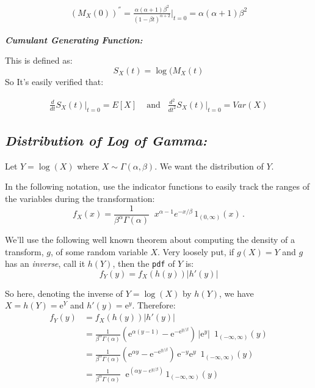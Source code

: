 \documentclass[12pt]{article}
\begin{document}
\begin{align*}
(M_X(0))^{''} =  \frac{\alpha (\alpha + 1) \beta^2} { (1 - \beta t)^{\alpha + 2}}  \Big | _{t=0} = \alpha (\alpha + 1)\beta^2
\end{align*}

\newpage

\begin{center}
\textbf{\color{TealBlue}\emph{Cumulant Generating Function:} } 
\end{center}
This is defined as:
$$
S_X(t) = \log (M_X(t)
$$
So 
It's easily verified that:


\begin{align*}
\frac{d}{dt} S_X(t) \Big|_{t=0} = E[X] \;\;\; \text{ and} \;\;\; \frac{d^2}{dt^2} S_X(t) \Big|_{t=0} = Var(X) 
\end{align*}

\bigskip
\begin{center}
\subsection*{\color{TealBlue}\emph{Distribution of Log of Gamma:} }
\end{center}







Let $Y = \log (X)$ where  $X\sim\Gamma(\alpha,\beta)$.  We want the distribution of $Y$. 

In the following notation, use the indicator functions to easily track the ranges of the variables during the transformation: 
$$ f_X(x) = \frac{1}{\beta^{\alpha}\Gamma(\alpha)} \;\; x^{\alpha-1} e^{-x/\beta} \, 1_{(0,\infty)}(x) \, . $$

We'll use the following well known theorem about computing the density of a transform, $g$, of some random variable $X$. Very loosely put, if $g(X) = Y$ and $g$ has an \emph{inverse}, call it $h(Y)$, then the \texttt{pdf} of $Y$ is:
$$
f_Y(y) = f_X(h(y)) |h'(y)|
$$

So here, denoting the inverse of $Y = \log (X)$ by $h(Y)$, we have $ X=h(Y)=\mathrm{e}^Y$ and $h'(y) = \mathrm{e}^{y}$. Therefore:
\begin{align*}
 f_Y(y) &= f_X(h(y)) |h'(y)| \\
 &= \frac{1}{\beta^\alpha \Gamma(\alpha)} \left(\mathrm{e}^{\alpha (y - 1)} - \mathrm{e}^{-\mathrm{e}^{y/\beta}}\right)\,|\mathrm{e}^{y}| \,\,\,1_{(-\infty,\infty)}(y) \\
  &= \frac{1}{\beta^\alpha \Gamma(\alpha)} \left(\mathrm{e}^{\alpha y} - \mathrm{e}^{-\mathrm{e}^{y/\beta}}\right)\,\mathrm{e}^{-y}\mathrm{e}^{y} \,\,\,1_{(-\infty,\infty)}(y) \\
 &= \frac{1}{\beta^\alpha \Gamma(\alpha)} \;\; \mathrm{e}^{\left(\alpha y - e^{y/\beta}\right)}\,1_{(-\infty,\infty)}(y) \\
\end{align*}
\end{document}
